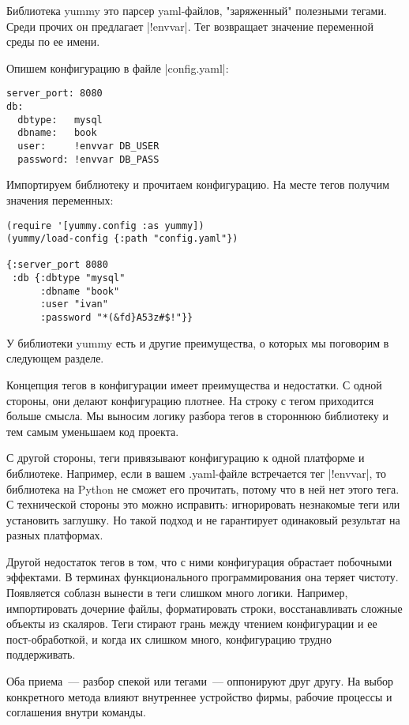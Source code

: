 Библиотека yummy это парсер yaml-файлов, "заряженный" полезными тегами. Среди
прочих он предлагает \spverb|!envvar|. Тег возвращает значение переменной среды по ее
имени.

Опишем конфигурацию в файле \spverb|config.yaml|:

\begin{verbatim}
server_port: 8080
db:
  dbtype:   mysql
  dbname:   book
  user:     !envvar DB_USER
  password: !envvar DB_PASS
\end{verbatim}

Импортируем библиотеку и прочитаем конфигурацию. На месте тегов получим значения
переменных:

\begin{verbatim}
(require '[yummy.config :as yummy])
(yummy/load-config {:path "config.yaml"})

{:server_port 8080
 :db {:dbtype "mysql"
      :dbname "book"
      :user "ivan"
      :password "*(&fd}A53z#$!"}}
\end{verbatim}

У библиотеки yummy есть и другие преимущества, о которых мы поговорим в
следующем разделе.

Концепция тегов в конфигурации имеет преимущества и недостатки. С одной стороны,
они делают конфигурацию плотнее. На строку с тегом приходится больше смысла. Мы
выносим логику разбора тегов в стороннюю библиотеку и тем самым уменьшаем код
проекта.

С другой стороны, теги привязывают конфигурацию к одной платформе и
библиотеке. Например, если в вашем .yaml-файле встречается тег \spverb|!envvar|, то
библиотека на Python не сможет его прочитать, потому что в ней нет этого тега. С
технической стороны это можно исправить: игнорировать незнакомые теги или
установить заглушку. Но такой подход и не гарантирует одинаковый результат на
разных платформах.

Другой недостаток тегов в том, что с ними конфигурация обрастает побочными
эффектами. В терминах функционального программирования она теряет
чистоту. Появляется соблазн вынести в теги слишком много логики. Например,
импортировать дочерние файлы, форматировать строки, восстанавливать сложные
объекты из скаляров. Теги стирают грань между чтением конфигурации и ее
пост-обработкой, и когда их слишком много, конфигурацию трудно поддерживать.

Оба приема~--- разбор спекой или тегами~--- оппонируют друг другу. На выбор
конкретного метода влияют внутреннее устройство фирмы, рабочие процессы и
соглашения внутри команды.

